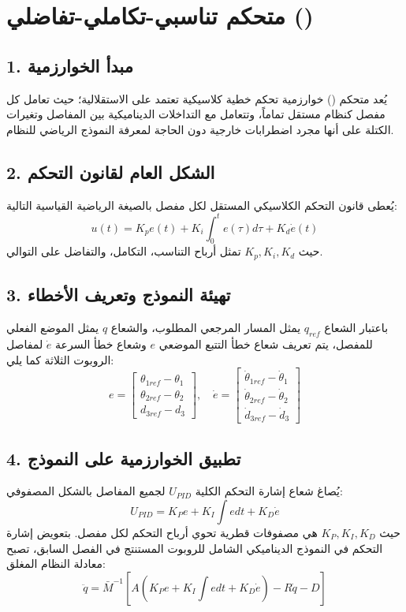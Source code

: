 \section{متحكم تناسبي-تكاملي-تفاضلي ()}
\label{sec:pid_control}

\subsection*{1. مبدأ الخوارزمية}
يُعد متحكم () خوارزمية تحكم خطية كلاسيكية تعتمد على الاستقلالية؛ حيث تعامل كل مفصل كنظام مستقل تماماً، وتتعامل مع التداخلات الديناميكية بين المفاصل وتغيرات الكتلة على أنها مجرد اضطرابات خارجية دون الحاجة لمعرفة النموذج الرياضي للنظام.

\subsection*{2. الشكل العام لقانون التحكم}
يُعطى قانون التحكم الكلاسيكي المستقل لكل مفصل بالصيغة الرياضية القياسية التالية:
\begin{equation}
u(t) = K_p e(t) + K_i \int_{0}^{t} e(\tau) d\tau + K_d \dot{e}(t)
\end{equation}
حيث $K_p, K_i, K_d$ تمثل أرباح التناسب، التكامل، والتفاضل على التوالي.

\subsection*{3. تهيئة النموذج وتعريف الأخطاء}
باعتبار الشعاع $q_{ref}$ يمثل المسار المرجعي المطلوب، والشعاع $q$ يمثل الموضع الفعلي للمفصل، يتم تعريف شعاع خطأ التتبع الموضعي $e$ وشعاع خطأ السرعة $\dot{e}$ لمفاصل الروبوت الثلاثة كما يلي:
\begin{equation}
e = \begin{bmatrix} \theta_{1ref} - \theta_1 \\ \theta_{2ref} - \theta_2 \\ d_{3ref} - d_3 \end{bmatrix} , \quad 
\dot{e} = \begin{bmatrix} \dot{\theta}_{1ref} - \dot{\theta}_1 \\ \dot{\theta}_{2ref} - \dot{\theta}_2 \\ \dot{d}_{3ref} - \dot{d}_3 \end{bmatrix}
\end{equation}

\subsection*{4. تطبيق الخوارزمية على النموذج}
يُصاغ شعاع إشارة التحكم الكلية $U_{PID}$ لجميع المفاصل بالشكل المصفوفي:
\begin{equation}
U_{PID} = K_P e + K_I \int e dt + K_D \dot{e}
\end{equation}
حيث $K_P, K_I, K_D$ هي مصفوفات قطرية تحوي أرباح التحكم لكل مفصل. بتعويض إشارة التحكم في النموذج الديناميكي الشامل للروبوت المستنتج في الفصل السابق، تصبح معادلة النظام المغلق:
\begin{equation}
\ddot{q} = \bar{M}^{-1} \left[ A \left( K_P e + K_I \int e dt + K_D \dot{e} \right) - R \dot{q} - D \right]
\end{equation}
